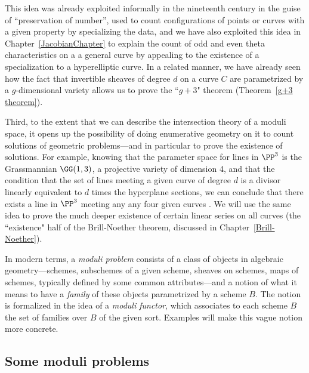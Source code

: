 This idea was already exploited informally in the nineteenth century in the guise of ``preservation of number'', used to count configurations of points or curves with a given property by specializing the 
data, and we have also exploited this idea in
Chapter~\ref{JacobianChapter} to explain the count of odd and even theta characteristics on a a general curve by appealing to the existence of a specialization to a hyperelliptic curve. In a related manner, we have already seen how the fact that invertible sheaves of degree $d$ on a curve $C$ are parametrized by a $g$-dimensional variety allows us to prove the ``$g+3$" theorem (Theorem~\ref{g+3 theorem}).

Third, to the extent that we can describe the intersection theory of a moduli space, it opens up the possibility of doing enumerative geometry on it to count solutions of geometric problems---and in particular to prove the existence of solutions. For example, knowing that the parameter space for lines in $\PP^3$ is the Grassmannian $\GG(1,3)$, a projective variety of dimension 4, and that the condition that the set of lines meeting a given curve of degree $d$
is a divisor linearly equivalent to  $d$ times the hyperplane sections, we can conclude  that there exists a line in $\PP^3$ meeting any any four given curves \cite[****]{3264}. We will use the same idea to prove the much deeper existence of certain linear series on all curves (the ``existence" half of the Brill-Noether theorem, discussed in Chapter~\ref{Brill-Noether}). 

In modern terms, a \emph{moduli problem} consists of a class of objects in algebraic geometry---schemes, subschemes of a given scheme, sheaves on schemes, maps of schemes, typically defined by some common attributes---and a notion of what it means to have a \emph{family} of these objects parametrized by a scheme $B$. The notion is formalized in the idea of a \emph{moduli functor}, 
which associates to each scheme $B$ the set of families over $B$ of the given sort. Examples will make this vague notion more concrete.

\subsection{Some moduli problems}

